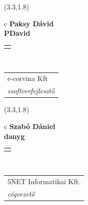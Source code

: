 \documentclass[11pt]{article}
\begin{document}
\makebox(3.3,1.8){
  \renewcommand\arraystretch{1.3}
  \begin{tabular}[c]{c}
    \hspace{8.5mm}
    \LARGE\bf{ Paksy Dávid }\\
    \hspace{8.5mm}
    \Large{ PDavid }\\
    \renewcommand\arraystretch{3}
    \begin{tabular}[c]{c}
      \centering
      \fontfamily{phv}\selectfont{
        \textbf{
          \textsc{
            \scriptsize{
            \color{Bright}{ Ismerkedő }\color{Bright}{ Webmester }\color{Bright}{ Sminkmester }\color{Dark}{ Programozó }
            }
          }
        }
      }
    \end{tabular}
    \\
    \renewcommand\arraystretch{1}
    \begin{tabular}{p{3.3in}}
      \hspace{.7cm}e-corvina Kft\\
      \hspace{.7cm}\emph{ szoftverfejlesztő }\\
    \end{tabular}
  \end{tabular}
}

\makebox(3.3,1.8){
  \renewcommand\arraystretch{1.3}
  \begin{tabular}[c]{c}
    \hspace{8.5mm}
    \LARGE\bf{ Szabó Dániel }\\
    \hspace{8.5mm}
    \Large{ danyg }\\
    \renewcommand\arraystretch{3}
    \begin{tabular}[c]{c}
      \centering
      \fontfamily{phv}\selectfont{
        \textbf{
          \textsc{
            \scriptsize{
            \color{Bright}{ Ismerkedő }\color{Bright}{ Webmester }\color{Dark}{ Sminkmester }\color{Dark}{ Programozó }
            }
          }
        }
      }
    \end{tabular}
    \\
    \renewcommand\arraystretch{1}
    \begin{tabular}{p{3.3in}}
      \hspace{.7cm}5NET Informatikai Kft.\\
      \hspace{.7cm}\emph{ cégvezető }\\
    \end{tabular}
  \end{tabular}
}
\end{document}
